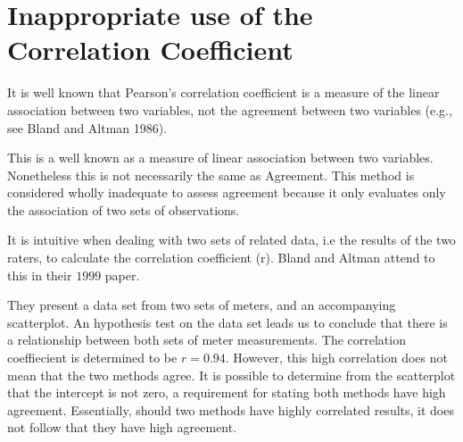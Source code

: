 \documentclass[12pt, a4paper]{report}
\theoremstyle{plain}
\theoremstyle{definition}
\theoremstyle{remark}
\begin{document}
			
	\section{Inappropriate use of the Correlation Coefficient}
It is well known that Pearson's correlation coefficient is a measure of the linear 		association between two variables, not the agreement between two variables (e.g., see Bland and Altman 1986).

This is a well known as a measure of linear association between two	variables. Nonetheless this is not necessarily the same as Agreement. This method is considered wholly inadequate to assess
		agreement because it only evaluates only the association of two sets of observations.
		
		
	It is intuitive when dealing with two sets of related data, i.e
	the results of the two raters, to calculate the correlation
	coefficient (r). Bland and Altman attend to this in their $1999$
	paper.
	
	They present a data set from two sets of meters, and an
	accompanying scatterplot. An hypothesis test on the data set leads
	us to conclude that there is a relationship between both sets of
	meter measurements. The correlation coeffiecient is determined to
	be $r =0.94 $. However, this high correlation does not mean that the
	two methods agree. It is possible to determine from the
	scatterplot that the intercept is not zero, a requirement for
	stating both methods have high agreement. Essentially, should two
	methods have highly correlated results, it does not follow that
	they have high agreement.
	
	
	


	
	\newpage
\end{document}
